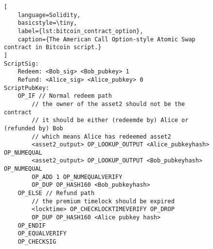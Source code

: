 \begin{figure}[htb]
\begin{lstlisting}[
    language=Solidity, 
    basicstyle=\tiny,
    label={lst:bitcoin_contract_option},
    caption={The American Call Option-style Atomic Swap contract in Bitcoin script.}
]
ScriptSig:
    Redeem: <Bob_sig> <Bob_pubkey> 1
    Refund: <Alice_sig> <Alice_pubkey> 0
ScriptPubKey:
    OP_IF // Normal redeem path
        // the owner of the asset2 should not be the contract
        // it should be either (redeemde by) Alice or (refunded by) Bob
        // which means Alice has redeemed asset2
        <asset2_output> OP_LOOKUP_OUTPUT <Alice_pubkeyhash> OP_NUMEQUAL
        <asset2_output> OP_LOOKUP_OUTPUT <Bob_pubkeyhash> OP_NUMEQUAL
        OP_ADD 1 OP_NUMEQUALVERIFY
        OP_DUP OP_HASH160 <Bob_pubkeyhash>
    OP_ELSE // Refund path
        // the premium timelock should be expired
        <locktime> OP_CHECKLOCKTIMEVERIFY OP_DROP
        OP_DUP OP_HASH160 <Alice pubkey hash>
    OP_ENDIF
    OP_EQUALVERIFY
    OP_CHECKSIG
\end{lstlisting}
\end{figure}

